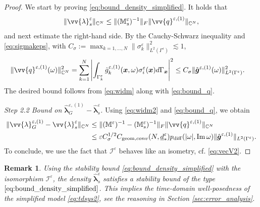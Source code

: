 \documentclass[]{article}
\newtheorem{remark}{Remark}
\numberwithin{equation}{section}
\numberwithin{theorem}{section}
\numberwithin{lemma}{section}
\numberwithin{corollary}{section}
\numberwithin{proposition}{section}
\numberwithin{definition}{section}
\newcommand{\mypar}[1]{\noindent\textit{#1}\hspace{0.1em}}
\newcommand{\re}{\varepsilon}
\renewcommand{\vec}{\boldsymbol}
\renewcommand{\Im}{\operatorname{Im}}
\begin{document}
	\begin{proof}
		We start by proving \eqref{eq:bound_density_simplified}. It holds that $$\|\vv{\lambda}^{\re}_s\|_{\mathbb{C}^N} \leq \| (\mathbb{M}^{\re}_s)^{-1} \|_F \| \vv{q}^{\re,(1)}\|_{\mathbb{C}^N},$$ and next estimate the right-hand side. By the Cauchy-Schwarz inequality and \eqref{eq:sigmakeps}, with $C_{\sigma} := \max_{k=1,\ldots,N}\|\sigma_k^{\re}\|^2_{L^2(\Gamma^{\re})}\lesssim 1$,
		\begin{align}%
			\label{eq:bound_q}
			\| \vv{q}^{\re,(1)}(\omega)\|^2_{\mathbb{C}^N}=\sum\limits_{k=1}^N\left|\int_{\Gamma_k^{\re}}\hat{g}_k^{\re,(1)}(\vec{x},\omega)\sigma_i^{\re}(\vec{x})d\Gamma_{\vec{x}}\right|^2&\leq C_{\sigma} \|\hat{\vec{g}}^{\re,(1)}(\omega)\|_{L^2(\Gamma^{\re})}^2.
		\end{align}	
		The desired bound follows from \eqref{eq:widm} along with \eqref{eq:bound_q}.
		
		\mypar{Step 2.2 Bound on $\hat{\vec{\lambda}}^{\re, (1)}_G -\hat{\vec{\lambda}}^{\re}_s$.}
		Using \eqref{eq:widm2} and \eqref{eq:bound_q}, we obtain 
		\begin{align}
			\label{eq:lambdas}
			\begin{split}
				\| \vv{\lambda}^{\re, (1)}_G - \vv{\lambda}^{\re}_s \|_{\mathbb{C}^N} &\leq \| (\mathbb{M}^{\re})^{-1} - (\mathbb{M}^{\re}_s)^{-1} \|_F \| \vv{q}^{\re,(1)} \|_{\mathbb{C}^N} \\
				&\leq \re C_{\sigma}^{1/2} {C}_{\operatorname{geom}, conv}( N,\underline{d}_*^{\re}) {p}_{\operatorname{diff}}(|\omega|,\Im \omega) \| \hat{\vec{g}}^{\re, (1)} \|_{L^2(\Gamma^{\re})}.
			\end{split}
		\end{align} 
		To conclude, we use the fact that $\mathcal{I}^{\re}$ behaves like an isometry, cf. \eqref{eq:vecV2}.
	\end{proof}
	
	\begin{remark}
		Using the stability bound \eqref{eq:bound_density_simplified} with the isomorphism $\mathcal{I}^{\re}$, the density $\hat{\vec{\lambda}}^{\re}_{s}$ satisfies a stability bound of the type $\eqref{eq:bound_density_simplified}$. This implies the time-domain well-posedness of the simplified model \eqref{eq:tdsys2}, see the reasoning in Section \ref{sec:error_analysis}. 
	\end{remark}
\end{document}
